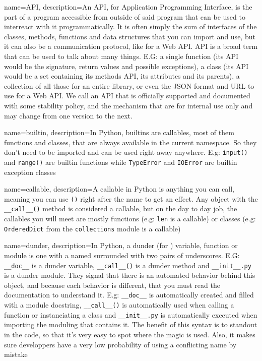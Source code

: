 \makeglossaries


{
    name=API,
    description={An API, for Application Programming Interface, is the part of a program accessible from outside of said program that can be used to interreact with it programmatically. It is often simply the sum of interfaces of the classes, methods, functions and data structures that you can import and use, but it can also be a communication protocol, like for a Web API. API is a broad term that can be used to talk about many things. E.G: a single function (its API would be the signature, return values and possible exceptions), a class (its API would be a set containing its methods API, its attributes and its parents), a collection of all those for an entire library, or even the JSON format and URL to use for a Web API. We call  an API that is officially supported and documented with some stability policy, and  the mechanism that are for internal use only and may change from one version to the next. }
}


{
    name=builtin,
    description={In Python, builtins are \glspl{callable}, most of them functions and classes, that are always available in the current namespace. So they don't need to be imported and can be used right away anywhere. E.g: \lstinline{input()} and \lstinline{range()} are builtin functions while \lstinline{TypeError} and \lstinline{IOError} are builtin exception classes}
}


{
    name=callable,
    description={A callable in Python is anything you can call, meaning you can use \lstinline{()} right after the name to get an effect. Any object with the \lstinline{__call__()} method is considered a callable, but on the day to day job, the callables you will meet are mostly functions (e.g: \lstinline{len} is a callable) or classes (e.g: \lstinline{OrderedDict} from the \lstinline{collections} module is a callable)}
}

{
    name=dunder,
    description={In Python, a dunder (for ) variable, function or module is one with a named surrounded with two pairs of underscores. E.G: \lstinline{__doc__} is a dunder variable, \lstinline{__call__()} is a dunder method and \lstinline{__init__.py} is a dunder module. They signal that there is an automated behavior behind this object, and because each behavior is different, that you must read the documentation to understand it. E.g: \lstinline{__doc__} is automatically created and filled with a module docstring, \lstinline{__call__()} is automatically used when calling a function or instanciating a class and \lstinline{__init__.py} is automatically executed when importing the moduling that contains it. The benefit of this syntax is to standout in the code, so that it's very easy to spot where the magic is used. Also, it makes sure developpers have a very low probability of using a conflicting name by mistake}
}

